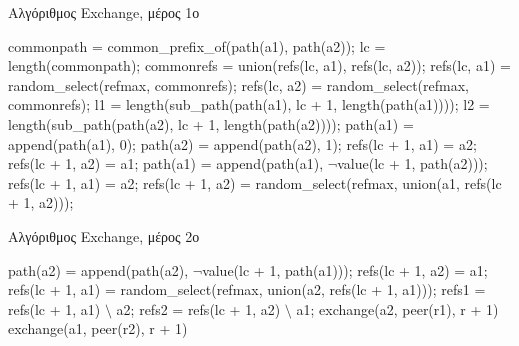 \begin{algorithm}
\caption{Αλγόριθμος Exchange, μέρος 1ο}
\label{algo:ExchangePart1}
\begin{algorithmic}[1]
        \State commonpath = common\_prefix\_of(path(a1), path(a2));
        \State lc = length(commonpath);
            \State commonrefs = union(refs(lc, a1), refs(lc, a2));
            \State refs(lc, a1) = random\_select(refmax, commonrefs);
            \State refs(lc, a2) = random\_select(refmax, commonrefs);
            \State l1 = length(sub\_path(path(a1), lc + 1, length(path(a1))));
            \State l2 = length(sub\_path(path(a2), lc + 1, length(path(a2))));            
\newline {}
             \label{code:ExchangeCase1}
                \State path(a1) = append(path(a1), 0);
                \State path(a2) = append(path(a2), 1);
                \State refs(lc + 1, a1) = {a2};
                \State refs(lc + 1, a2) = {a1};
            \EndIf
\newline {}
             \label{code:ExchangeCase2}
                \State path(a1) = append(path(a1), $\neg$value(lc + 1, path(a2)));
                \State refs(lc + 1, a1) = {a2};
                \State refs(lc + 1, a2) = random\_select(refmax, union({a1}, refs(lc + 1, a2)));
            \EndIf
{}
\end{algorithmic}
\end{algorithm}

\begin{algorithm}[h]
\caption{Αλγόριθμος Exchange, μέρος 2ο}
\label{algo:ExchangePart2}
\begin{algorithmic}[1]
\item[] 
             \label{code:ExchangeCase3}
                \State path(a2) = append(path(a2), $\neg$value(lc + 1, path(a1)));
                \State refs(lc + 1, a2) = {a1};
                \State refs(lc + 1, a1) = random\_select(refmax, union({a2}, refs(lc + 1, a1)));
            \EndIf
\newline {}
             \label{code:ExchangeCase4}
                \State refs1 = refs(lc + 1, a1) $\setminus$ {a2};
                \State refs2 = refs(lc + 1, a2) $\setminus$ {a1};
                        \State exchange(a2, peer(r1), r + 1)
                    \EndIf
                \EndFor
                        \State exchange(a1, peer(r2), r + 1)
                    \EndIf
                \EndFor
            \EndIf
        \EndIf
  \EndProcedure
\end{algorithmic}
\end{algorithm}


